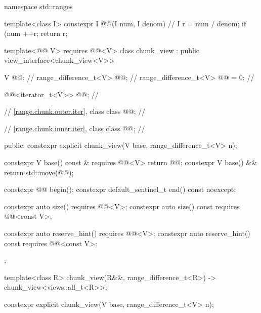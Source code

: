%
\begin{codeblock}
namespace std::ranges {
  template<class I>
  constexpr I @@(I num, I denom) {                  // \expos
    I r = num / denom;
    if (num %
      ++r;
    return r;
  }

  template<@@ V>
    requires @@<V>
  class chunk_view : public view_interface<chunk_view<V>> {
    V @@;                                              // \expos
    range_difference_t<V> @@;                             // \expos
    range_difference_t<V> @@ = 0;                 // \expos

    @@<iterator_t<V>> @@;       // \expos

    // \ref{range.chunk.outer.iter}, class 
    class @@;                                 // \expos

    // \ref{range.chunk.inner.iter}, class 
    class @@;                                 // \expos

  public:
    constexpr explicit chunk_view(V base, range_difference_t<V> n);

    constexpr V base() const & requires @@<V> { return @@; }
    constexpr V base() && { return std::move(@@); }

    constexpr @@ begin();
    constexpr default_sentinel_t end() const noexcept;

    constexpr auto size() requires @@<V>;
    constexpr auto size() const requires @@<const V>;

    constexpr auto reserve_hint() requires @@<V>;
    constexpr auto reserve_hint() const requires @@<const V>;
  };

  template<class R>
    chunk_view(R&&, range_difference_t<R>) -> chunk_view<views::all_t<R>>;
}
\end{codeblock}

%
\begin{itemdecl}
constexpr explicit chunk_view(V base, range_difference_t<V> n);
\end{itemdecl}

